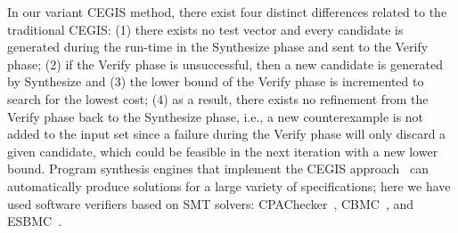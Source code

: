 \documentclass[runningheads]{llncs}
\begin{document}
In our variant CEGIS method, there exist four distinct differences related to the traditional CEGIS: 
(1) there exists no test vector and every candidate is generated during the run-time in the {\sc Synthesize} phase and sent to the {\sc Verify} phase; 
(2) if the {\sc Verify} phase is unsuccessful, then a new candidate is generated by {\sc Synthesize} and 
(3) the lower bound of the {\sc Verify} phase is incremented to search for the lowest cost; 
(4) as a result, there exists no refinement from the {\sc Verify} phase back to the {\sc Synthesize} phase, i.e., 
a new counterexample is not added to the {\sc input} set since a failure during the {\sc Verify} phase will only discard a given candidate, which could be feasible in the next iteration with a new lower bound.
%
Program synthesis engines that implement the CEGIS approach~\cite{sketch} can automatically produce solutions for a large variety of specifications; %
here we have used software verifiers based on SMT solvers: %
CPAChecker~\cite{Beyer2011}, CBMC~\cite{Kroening}, and ESBMC~\cite{esbmc2018}.

\end{document}
